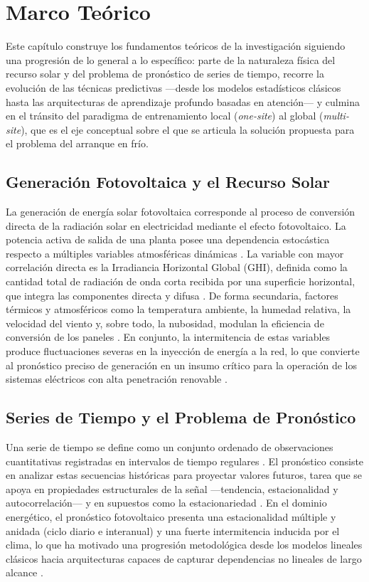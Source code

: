 \section{Marco Teórico}
Este capítulo construye los fundamentos teóricos de la investigación siguiendo una progresión de lo general a lo específico: parte de la naturaleza física del recurso solar y del problema de pronóstico de series de tiempo, recorre la evolución de las técnicas predictivas —desde los modelos estadísticos clásicos hasta las arquitecturas de aprendizaje profundo basadas en atención— y culmina en el tránsito del paradigma de entrenamiento local (\textit{one-site}) al global (\textit{multi-site}), que es el eje conceptual sobre el que se articula la solución propuesta para el problema del arranque en frío.

\subsection{Generación Fotovoltaica y el Recurso Solar}
La generación de energía solar fotovoltaica corresponde al proceso de conversión directa de la radiación solar en electricidad mediante el efecto fotovoltaico. La potencia activa de salida de una planta posee una dependencia estocástica respecto a múltiples variables atmosféricas dinámicas \cite{DuffieBeckman2013}. La variable con mayor correlación directa es la Irradiancia Horizontal Global (GHI), definida como la cantidad total de radiación de onda corta recibida por una superficie horizontal, que integra las componentes directa y difusa \cite{DuffieBeckman2013}. De forma secundaria, factores térmicos y atmosféricos como la temperatura ambiente, la humedad relativa, la velocidad del viento y, sobre todo, la nubosidad, modulan la eficiencia de conversión de los paneles \cite{DuffieBeckman2013}. En conjunto, la intermitencia de estas variables produce fluctuaciones severas en la inyección de energía a la red, lo que convierte al pronóstico preciso de generación en un insumo crítico para la operación de los sistemas eléctricos con alta penetración renovable \cite{cen2025}.

\subsection{Series de Tiempo y el Problema de Pronóstico}
Una serie de tiempo se define como un conjunto ordenado de observaciones cuantitativas registradas en intervalos de tiempo regulares \cite{Peixeiro2022}. El pronóstico consiste en analizar estas secuencias históricas para proyectar valores futuros, tarea que se apoya en propiedades estructurales de la señal —tendencia, estacionalidad y autocorrelación— y en supuestos como la estacionariedad \cite{Peixeiro2022}. En el dominio energético, el pronóstico fotovoltaico presenta una estacionalidad múltiple y anidada (ciclo diario e interanual) y una fuerte intermitencia inducida por el clima, lo que ha motivado una progresión metodológica desde los modelos lineales clásicos hacia arquitecturas capaces de capturar dependencias no lineales de largo alcance \cite{Benidis2022}.

